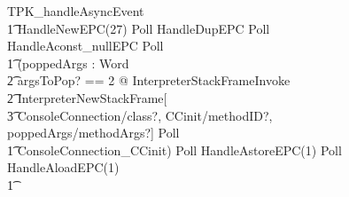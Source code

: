\begin{figure}
  \setlength{\zedtab}{0.4cm}
  \setlength{\zedindent}{0pt}
  \setlength{\zedleftsep}{0pt}
  \setlength{\abovedisplayskip}{0pt}
  \setlength{\belowdisplayskip}{0pt}
  \setlength{\abovedisplayshortskip}{0pt}
  \setlength{\belowdisplayshortskip}{0pt}
  \begin{circus}
    TPK\_handleAsyncEvent \circdef \\
    \t1 HandleNewEPC(27) \circseq Poll \circseq HandleDupEPC \circseq Poll \circseq  HandleAconst\_nullEPC \circseq Poll \circseq \\
    \t1 (\circvar poppedArgs : \seq Word \circspot \\
    \t2 \lschexpract \exists argsToPop? == 2 @ InterpreterStackFrameInvoke \rschexpract \circseq \\
    \t2 \lschexpract InterpreterNewStackFrame[\\
    \t3 ConsoleConnection/class?, CCinit/methodID?, poppedArgs/methodArgs?] \rschexpract \circseq Poll \circseq \\
    \t1 ConsoleConnection\_CCinit) \circseq Poll \circseq HandleAstoreEPC(1) \circseq Poll \circseq HandleAloadEPC(1) \circseq \\
    \t1 {} \cdots {} \\

\end{circus}
\end{figure}
